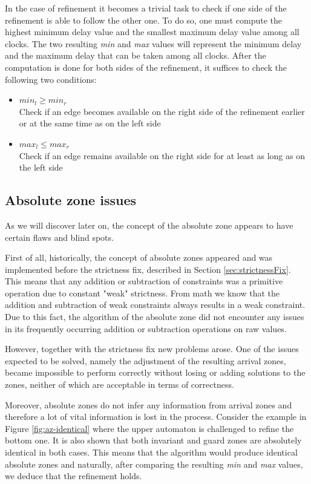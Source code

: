 In the case of refinement it becomes a trivial task to check if one side of the refinement is able to follow the other one. To do so, one must compute the highest minimum delay value and the smallest maximum delay value among all clocks. The two resulting \textit{min} and \textit{max} values will represent the minimum delay and the maximum delay that can be taken among all clocks. After the computation is done for both sides of the refinement, it suffices to check the following two conditions:
\begin{itemize}
    \item $min_l \geq min_r$\\
    Check if an edge becomes available on the right side of the refinement earlier or at the same time as on the left side
    \item $max_l \leq max_r$\\
    Check if an edge remains available on the right side for at least as long as on the left side
\end{itemize}

\subsection{Absolute zone issues}
As we will discover later on, the concept of the absolute zone appears to have certain flaws and blind spots.

First of all, historically, the concept of absolute zones appeared and was implemented before the strictness fix, described in Section \ref{sec:strictnessFix}. This means that any addition or subtraction of constraints was a primitive operation due to constant "weak" strictness. From math we know that the addition and subtraction of weak constraints always results in a weak constraint. Due to this fact, the algorithm of the absolute zone did not encounter any issues in its frequently occurring addition or subtraction operations on raw values.

However, together with the strictness fix new problems arose. One of the issues expected to be solved, namely the adjustment of the resulting arrival zones, became impossible to perform correctly without losing or adding solutions to the zones, neither of which are acceptable in terms of correctness. 

\medskip

Moreover, absolute zones do not infer any information from arrival zones and therefore a lot of vital information is lost in the process. Consider the example in Figure \ref{fig:az-identical} where the upper automaton is challenged to refine the bottom one. It is also shown that both invariant and guard zones are absolutely identical in both cases. This means that the algorithm would produce identical absolute zones and naturally, after comparing the resulting \textit{min} and \textit{max} values, we deduce that the refinement holds. 

